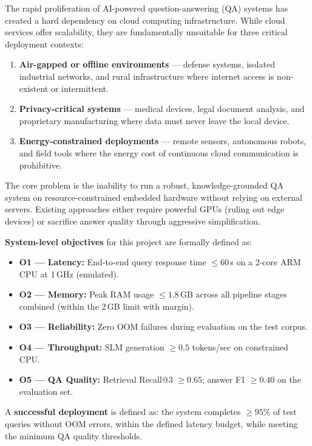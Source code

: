 \documentclass[10pt,twocolumn]{article}
\begin{document}
The rapid proliferation of AI-powered question-answering (QA) systems has created a hard dependency on cloud computing infrastructure. While cloud services offer scalability, they are fundamentally unsuitable for three critical deployment contexts:

\begin{enumerate}[leftmargin=*,itemsep=2pt]
  \item \textbf{Air-gapped or offline environments} — defense systems, isolated industrial networks, and rural infrastructure where internet access is non-existent or intermittent.
  \item \textbf{Privacy-critical systems} — medical devices, legal document analysis, and proprietary manufacturing where data must never leave the local device.
  \item \textbf{Energy-constrained deployments} — remote sensors, autonomous robots, and field tools where the energy cost of continuous cloud communication is prohibitive.
\end{enumerate}

The core problem is the inability to run a robust, knowledge-grounded QA system on resource-constrained embedded hardware without relying on external servers. Existing approaches either require powerful GPUs (ruling out edge devices) or sacrifice answer quality through aggressive simplification.

\textbf{System-level objectives} for this project are formally defined as:

\begin{itemize}[leftmargin=*,itemsep=2pt]
  \item \textbf{O1 — Latency:} End-to-end query response time $\leq 60$\,s on a 2-core ARM CPU at 1\,GHz (emulated).
  \item \textbf{O2 — Memory:} Peak RAM usage $\leq 1.8$\,GB across all pipeline stages combined (within the 2\,GB limit with margin).
  \item \textbf{O3 — Reliability:} Zero OOM failures during evaluation on the test corpus.
  \item \textbf{O4 — Throughput:} SLM generation $\geq 0.5$ tokens/sec on constrained CPU.
  \item \textbf{O5 — QA Quality:} Retrieval Recall@3 $\geq 0.65$; answer F1 $\geq 0.40$ on the evaluation set.
\end{itemize}

A \textbf{successful deployment} is defined as: the system completes $\geq 95\%$ of test queries without OOM errors, within the defined latency budget, while meeting the minimum QA quality thresholds.
\end{document}
